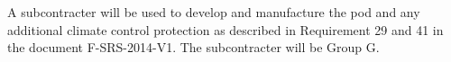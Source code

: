 A subcontracter will be used to develop and manufacture the pod and any additional climate control protection as described in Requirement 29 and 41 in the document F-SRS-2014-V1. The subcontracter will be Group G. 